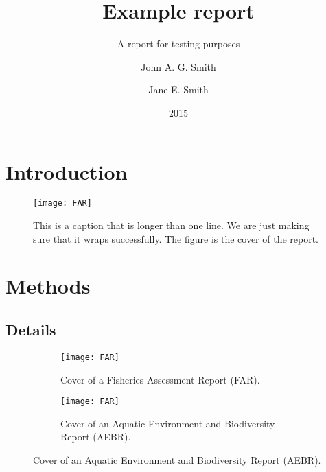 \documentclass[draft]{mpi-far}
\title{Example report}{An example Fisheries Assessment Report (FAR) for JMA\nobreakspace1}
\subtitle{A report for testing purposes}
\date{2015}
\author{John A. G. Smith \and Jane E. Smith}
\begin{document}
\maketitle

\tableofcontents


\summary

\citeself

\lipsum[1]
\clearpage


\section{Introduction}

\lipsum[1]


\begin{figure}[h]
  \begin{center}  
  \texttt{[image: FAR]}
  \end{center}  
  \caption{This is a caption that is longer than one line. We are just
  making sure that it wraps successfully. The figure is the cover of
  the report.}
\end{figure}

\section{Methods}

\subsection{Details}

\lipsum[2]

\begin{figure}[h]
\begin{center}
  \begin{subfigure}{0.45\textwidth}
  \texttt{[image: FAR]}
  \caption{Cover of a Fisheries Assessment Report (FAR).}
\end{subfigure}\qquad
  \begin{subfigure}{0.45\textwidth}
  \texttt{[image: FAR]}
  \caption{Cover of an Aquatic Environment and Biodiversity Report
  (AEBR).}
\end{subfigure}
\end{center}
\end{figure}
\end{document}
